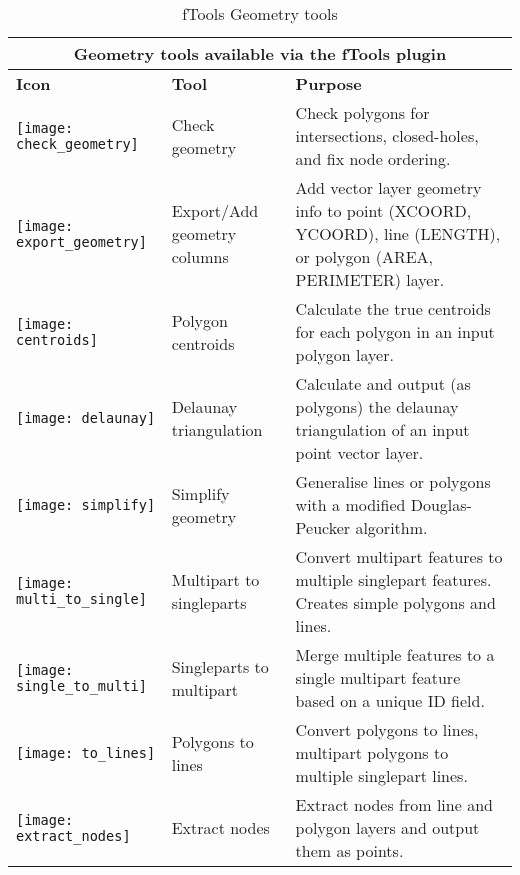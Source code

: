 \begin{table}[ht]
\centering
\begin{tabular}{|m{1cm}|m{3cm}|m{9cm}|}
 \hline \multicolumn{3}{|c|}{\textbf{Geometry tools available via the fTools plugin}} \\
 \hline \textbf{Icon} & \textbf{Tool} & \textbf{Purpose} \\
 \hline \texttt{[image: check\_geometry]} & Check geometry & 
Check polygons for intersections, closed-holes, and fix node ordering. \\
 \hline \texttt{[image: export\_geometry]} & Export/Add geometry 
columns & Add vector layer geometry info to point (XCOORD, YCOORD), 
line (LENGTH), or polygon (AREA, PERIMETER) layer. \\
 \hline \texttt{[image: centroids]} & Polygon centroids & 
Calculate the true centroids for each polygon in an input polygon layer. \\
 \hline \texttt{[image: delaunay]} & Delaunay triangulation & 
Calculate and output (as polygons) the delaunay triangulation of an input point vector layer. \\
 \hline \texttt{[image: simplify]} & Simplify geometry & 
Generalise lines or polygons with a modified Douglas-Peucker algorithm. \\
 \hline \texttt{[image: multi\_to\_single]} & Multipart to 
singleparts & Convert multipart features to multiple singlepart features. 
Creates simple polygons and lines. \\
 \hline \texttt{[image: single\_to\_multi]} & Singleparts to 
multipart & Merge multiple features to a single multipart feature based 
on a unique ID field. \\
 \hline \texttt{[image: to\_lines]} & Polygons to lines 
& Convert polygons to lines, multipart polygons to multiple singlepart lines. \\
 \hline \texttt{[image: extract\_nodes]} & Extract nodes & 
Extract nodes from line and polygon layers and output them as points. \\
 \hline
\end{tabular}
\caption{fTools Geometry tools}\label{tab:ftool_geometry}
\end{table}

